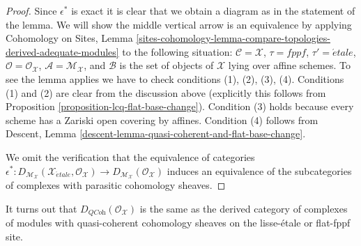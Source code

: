 \begin{proof}
Since $\epsilon^*$ is exact it is clear that we obtain a diagram as
in the statement of the lemma. We will show the middle vertical
arrow is an equivalence by applying
Cohomology on Sites, Lemma
\ref{sites-cohomology-lemma-compare-topologies-derived-adequate-modules}
to the following situation:
$\mathcal{C} = \mathcal{X}$,
$\tau = fppf$,
$\tau' = \acute{e}tale$,
$\mathcal{O} = \mathcal{O}_\mathcal{X}$,
$\mathcal{A} = \mathcal{M}_\mathcal{X}$, and
$\mathcal{B}$ is the set of objects of $\mathcal{X}$ lying over
affine schemes. To see the lemma applies we have to check conditions
(1), (2), (3), (4). Conditions (1) and (2) are clear from the discussion
above (explicitly this follows from
Proposition \ref{proposition-lcq-flat-base-change}).
Condition (3) holds because every scheme has a Zariski
open covering by affines. Condition (4) follows from
Descent, Lemma \ref{descent-lemma-quasi-coherent-and-flat-base-change}.

\medskip\noindent
We omit the verification that the equivalence of
categories $\epsilon^* : 
D_{\mathcal{M}_\mathcal{X}}(
\mathcal{X}_{\acute{e}tale}, \mathcal{O}_\mathcal{X})
\to
D_{\mathcal{M}_\mathcal{X}}(\mathcal{O}_\mathcal{X})$
induces an equivalence of the subcategories of complexes
with parasitic cohomology sheaves.
\end{proof}

\noindent
It turns out that $D_{\textit{QCoh}}(\mathcal{O}_\mathcal{X})$
is the same as the derived category of complexes of modules
with quasi-coherent cohomology sheaves on the lisse-\'etale or
flat-fppf site.

